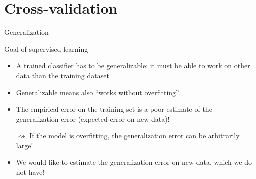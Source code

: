 \documentclass[xcolor={usenames,dvipsnames},handout]{beamer}
\begin{document}
 \section{Cross-validation}
 
 \begin{frame}{Generalization}
 
\begin{block}{Goal of supervised learning}
\begin{itemize}
\item A trained classifier has to be generalizable: it must be able to work on other data than the training dataset
\item Generalizable means also “works without overfitting”. 
\end{itemize}
\end{block}
\begin{itemize}
\item The empirical error on the training set is a poor estimate of the generalization error (expected error on new data)!

$\rightsquigarrow$ If the model is overfitting, the generalization error can be arbitrarily large!
\item  We would like to estimate the generalization error on new data, which we do not have!
\end{itemize}

\end{frame}
 
\end{document}
